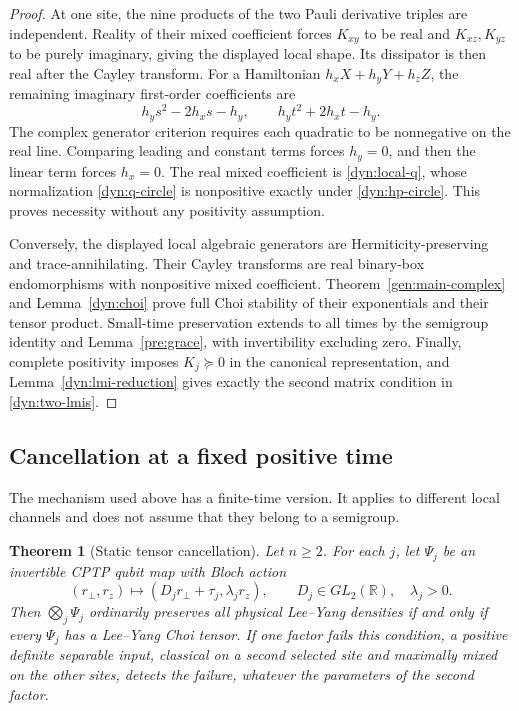 \documentclass[reqno]{amsart}
\newtheorem{theorem}{Theorem}[section]
\theoremstyle{definition}
\theoremstyle{remark}
\newcommand{\R}{\mathbb R}
\begin{document}
\begin{proof}
At one site, the nine products of the two Pauli derivative triples are
independent.  Reality of their mixed coefficient forces $K_{xy}$ to
be real and $K_{xz},K_{yz}$ to be purely imaginary, giving the displayed
local shape.  Its dissipator is then real after the Cayley transform.
For a Hamiltonian $h_xX+h_yY+h_zZ$, the remaining imaginary first-order
coefficients are
\[
 h_y s^2-2h_xs-h_y,\qquad h_y t^2+2h_xt-h_y.
\]
The complex generator criterion requires each quadratic to be
nonnegative on the real line.  Comparing leading and constant terms
forces $h_y=0$, and then the linear term forces $h_x=0$.
The real mixed coefficient is \eqref{dyn:local-q}, whose normalization
\eqref{dyn:q-circle} is nonpositive exactly under \eqref{dyn:hp-circle}.
This proves necessity without any positivity assumption.

Conversely, the displayed local algebraic generators are
Hermiticity-preserving and trace-annihilating.  Their Cayley transforms
are real binary-box endomorphisms with nonpositive mixed coefficient.
Theorem~\ref{gen:main-complex} and Lemma~\ref{dyn:choi} prove full Choi
stability of their exponentials and their tensor product.  Small-time
preservation extends to all times by the semigroup identity and
Lemma~\ref{pre:grace}, with invertibility excluding zero.
Finally, complete positivity imposes $K_j\succeq0$ in the canonical
representation, and Lemma~\ref{dyn:lmi-reduction} gives exactly the
second matrix condition in \eqref{dyn:two-lmis}.
\end{proof}

\subsection{Cancellation at a fixed positive time}

The mechanism used above has a finite-time version.  It applies to different
local channels and does not assume that they belong to a semigroup.

\begin{theorem}[Static tensor cancellation]\label{dyn:static-cancellation}
Let $n\ge2$.  For each $j$, let $\Psi_j$ be an invertible CPTP qubit map
with Bloch action
\[
 (r_\perp,r_z)\longmapsto(D_jr_\perp+\tau_j,\lambda_jr_z),
 \qquad D_j\in GL_2(\R),\quad\lambda_j>0.
\]
Then $\bigotimes_j\Psi_j$ ordinarily preserves all physical Lee--Yang
densities if and only if every $\Psi_j$ has a Lee--Yang Choi tensor.
If one factor fails this condition, a positive definite separable input,
classical on a second selected site and maximally mixed on the other sites,
detects the failure, whatever the parameters of the second factor.
\end{theorem}
\end{document}
